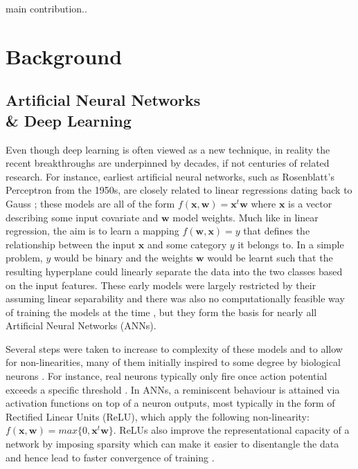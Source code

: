 \documentclass[12pt]{report}
\begin{document}
main contribution..

\newpage

\chapter{Background} \label{ch:backg}

\section{Artificial Neural Networks \\ \& Deep Learning}

Even though deep learning is often viewed as a new technique, in reality the recent breakthroughs are underpinned by decades, if not centuries of related research. For instance, earliest artificial neural networks, such as Rosenblatt's Perceptron \cite{Rosenblatt1958} from the 1950s, are closely related to linear regressions dating back to Gauss \cite{JurgenSchmidhuber2015}; these models are all of the form $f(\mathbf{x}, \mathbf{w})=\mathbf{x}^t \mathbf{w}$ where $\mathbf{x}$ is a vector describing some input covariate and $\mathbf{w}$ model weights. Much like in linear regression, the aim is to learn a mapping $f(\mathbf{w}, \mathbf{x}) = y$ that defines the relationship between the input $\mathbf{x}$ and some category $y$ it belongs to. In a simple problem,  $y$ would be binary and the weights $\mathbf{w}$ would be learnt such that the resulting hyperplane could linearly separate the data into the two classes based on the input features. These early models were largely restricted by their assuming linear separability and there was also no computationally feasible way of training the models at the time \cite{Goodfellow2016}, \cite{JurgenSchmidhuber2015} but they form the basis for nearly all Artificial Neural Networks (ANNs). 

Several steps were taken to increase to complexity of these models and to allow for non-linearities, many of them initially inspired to some degree by biological neurons \cite{Goodfellow16}. For instance, real neurons typically only fire once action potential exceeds a specific threshold \cite{Hodgkin1990}. In ANNs, a reminiscent behaviour is attained via activation functions on top of a neuron outputs, most typically in the form of Rectified Linear Units (ReLU), which apply the following non-linearity: $f(\mathbf{x}, \mathbf{w})=max\{0, \mathbf{x}^t \mathbf{w}\}$. ReLUs also improve the representational capacity of a network by imposing sparsity which can make it easier to disentangle the data \cite{Glorot2011} and hence lead to faster convergence of training \cite{Krizhevsky2012}.
\end{document}
